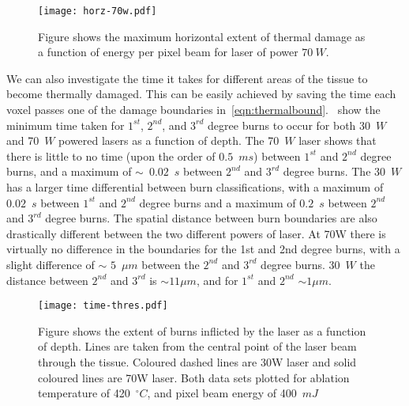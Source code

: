 
\begin{figure}[!h]
	\centering
	\texttt{[image: horz-70w.pdf]}
	\caption{Figure shows the maximum horizontal extent of thermal damage as a function of energy per pixel beam for laser of power $70~W$.}
	\label{fig:horz-70}
\end{figure}

\medskip

We can also investigate the time it takes for different areas of the tissue to become thermally damaged. This can be easily achieved by saving the time each voxel passes one of the damage boundaries in~\cref{eqn:thermalbound}.~ show the minimum time taken for $1^{st}$, $2^{nd}$, and $3^{rd}$ degree burns to occur for both 30~$W$ and 70~$W$ powered lasers as a function of depth. The 70~$W$ laser shows that there is little to no time (upon the order of $0.5$~$ms$) between $1^{st}$ and $2^{nd}$ degree burns, and a maximum of $\sim$~$0.02$~$s$ between $2^{nd}$ and $3^{rd}$ degree burns.
The 30~$W$ has a larger time differential between burn classifications, with a maximum of $0.02$~$s$ between $1^{st}$ and $2^{nd}$ degree burns and a maximum of $0.2$~$s$ between $2^{nd}$ and $3^{rd}$ degree burns.
The spatial distance between burn boundaries are also drastically different between the two different powers of laser. At 70W there is virtually no difference in the boundaries for the 1st and 2nd degree burns, with a slight difference of $\sim$ $5$~$\mu m$ between the $2^{nd}$ and $3^{rd}$ degree burns. 30~$W$ the distance between $2^{nd}$ and $3^{rd}$ is $\sim 11\mu m$, and for  $1^{st}$ and $2^{nd}$ $\sim 1 \mu m$.
	
\begin{figure}
	\centering
	\texttt{[image: time-thres.pdf]}
	\caption{Figure shows the extent of burns inflicted by the laser as a function of depth. Lines are taken from the central point of the laser beam through the tissue. Coloured dashed lines are 30W laser and solid coloured lines are 70W laser. Both data sets plotted for ablation temperature of 420~$^{\circ}C$, and pixel beam energy of 400~$mJ$}
	\label{fig:time-thres}
\end{figure}	
	
